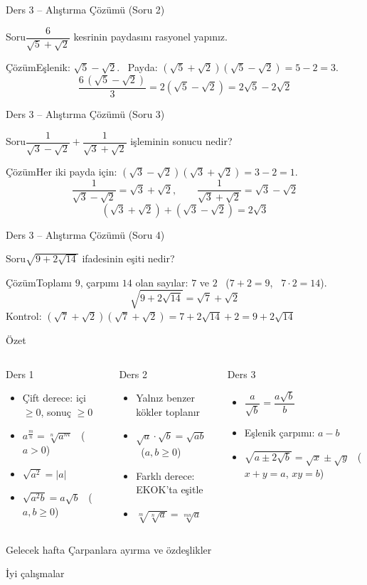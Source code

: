 \documentclass[aspectratio=169,11pt,handout]{beamer}
\newcommand{\soru}[3]{%
\begin{frame}{#1}
  \begin{block}{Soru}\large #2\end{block}
  \pause
  \begin{exampleblock}{Çözüm}\large #3\end{exampleblock}
\end{frame}}
\begin{document}
\soru{Ders 3 -- Alıştırma Çözümü (Soru 2)}
{\(\dfrac{6}{\sqrt5+\sqrt2}\) kesrinin paydasını rasyonel yapınız.}
{Eşlenik: \(\sqrt5-\sqrt2\). \ Payda: \((\sqrt5+\sqrt2)(\sqrt5-\sqrt2)=5-2=3\).
\[\frac{6\,(\sqrt5-\sqrt2)}{3}=2(\sqrt5-\sqrt2)=2\sqrt5-2\sqrt2\]}

\soru{Ders 3 -- Alıştırma Çözümü (Soru 3)}
{\(\dfrac{1}{\sqrt3-\sqrt2}+\dfrac{1}{\sqrt3+\sqrt2}\) işleminin sonucu nedir?}
{Her iki payda için: \((\sqrt3-\sqrt2)(\sqrt3+\sqrt2)=3-2=1\).
\[\frac{1}{\sqrt3-\sqrt2}=\sqrt3+\sqrt2,\qquad \frac{1}{\sqrt3+\sqrt2}=\sqrt3-\sqrt2\]
\[(\sqrt3+\sqrt2)+(\sqrt3-\sqrt2)=2\sqrt3\]}

\soru{Ders 3 -- Alıştırma Çözümü (Soru 4)}
{\(\sqrt{9+2\sqrt{14}}\) ifadesinin eşiti nedir?}
{Toplamı \(9\), çarpımı \(14\) olan sayılar: \(7\) ve \(2\) \ (\(7+2=9\), \ \(7\cdot 2=14\)).
\[\sqrt{9+2\sqrt{14}}=\sqrt7+\sqrt2\]
Kontrol: \((\sqrt7+\sqrt2)(\sqrt7+\sqrt2)=7+2\sqrt{14}+2=9+2\sqrt{14}\) \checkmark}


\begin{frame}{Özet}
\begin{columns}[t]
\begin{block}{Ders 1}
\begin{itemize}
\item Çift derece: içi \(\ge 0\), sonuç \(\ge 0\)
\item \(a^{\frac mn}=\sqrt[n]{a^m}\) \ (\(a>0\))
\item \(\sqrt{a^2}=|a|\)
\item \(\sqrt{a^2b}=a\sqrt b\) \ (\(a,b\ge 0\))
\end{itemize}
\end{block}
\begin{block}{Ders 2}
\begin{itemize}
\item Yalnız benzer kökler toplanır
\item \(\sqrt a\cdot\sqrt b=\sqrt{ab}\) \ (\(a,b\ge 0\))
\item Farklı derece: EKOK'ta eşitle
\item \(\sqrt[m]{\sqrt[n]{a}}=\sqrt[mn]{a}\)
\end{itemize}
\end{block}
\begin{block}{Ders 3}
\begin{itemize}
\item \(\dfrac{a}{\sqrt b}=\dfrac{a\sqrt b}{b}\)
\item Eşlenik çarpımı: \(a-b\)
\item \(\sqrt{a\pm 2\sqrt b}=\sqrt x\pm\sqrt y\) \ (\(x+y=a\), \(xy=b\))
\end{itemize}
\end{block}
\end{columns}
\vspace{6pt}
\begin{alertblock}{Gelecek hafta}
Çarpanlara ayırma ve özdeşlikler
\end{alertblock}
\end{frame}

\begin{frame}
\centering\Large İyi çalışmalar
\end{frame}
\end{document}
